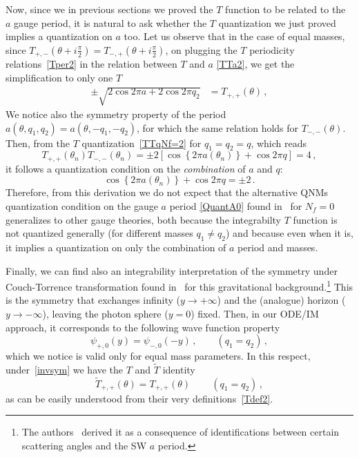 \documentclass[11pt,a4paper]{elsarticle}
\def \th {\theta}
\def \ba {\begin{aligned}}
\def \ea {\end{aligned}}
\newcommand{\be}{\begin{equation}}
\newcommand{\ee}{\end{equation}}
\def\th{\theta}
\numberwithin{figure}{section}
\numberwithin{table}{section}
\begin{document}
Now, since we in previous sections we proved the $T$ function to be related to the $a$ gauge period, it is natural to ask whether the $T$ quantization we just proved implies a quantization on $a$ too. Let us observe that in the case of equal masses, since $T_{+,-}(\th+i \frac{\pi}{2})= T_{-,+}(\th+i \frac{\pi}{2})$, on plugging the $T$ periodicity relations~\eqref{Tper2} in the relation between $T$ and $a$ 
 \eqref{TTa2}, we get the simplification to only one $T$
\be \label{TnuNf=2simp}
\ba
\pm \sqrt{2 \cos 2\pi a + 2 \cos 2 \pi q_2} &= T_{+,+}(\th)\,,%
\ea
\ee 
We notice also the symmetry property of the period $a(\theta,q_1,q_2) = a(\theta,-q_1,-q_2)$, %
for which the same relation holds for $T_{-,-}(\th)$. %
Then, from the $T$ quantization~\eqref{TTqNf=2} for $q_1=q_2=q$, which reads
\be 
T_{+,+}(\th_n) T_{-,-}(\th_n) =\pm2 \left[ \cos \left\{2\pi a (\th_n)\right\}+  \cos 2 \pi q \right] = 4\,,
\ee 
it follows a quantization condition on the \textit{combination} of $a$ and $q$:
\be  \label{nuqQuant}
 \cos \left\{2\pi a (\th_n)\right\}+ \cos  2 \pi q   =\pm  2 \, .
\ee
Therefore, from this derivation we do not expect that the alternative QNMs quantization condition on the gauge $a$ period \eqref{QuantA0} found in~\cite{BianchiConsoliGrilloMorales:2021} for $N_f=0$ generalizes to other gauge theories, both because the integrabilty $T$ function is not quantized generally (for different masses $q_1\neq q_2$) and because even when it is, it implies a quantization on only the combination of $a $ period and masses.

Finally, we can find also an integrability interpretation of the symmetry under Couch-Torrence transformation found in~\cite{BianchiDiRusso:2021} for this gravitational background.\footnote{The authors~\cite{BianchiDiRusso:2021} derived it as a consequence of identifications between certain scattering angles and the SW $a$ period.} This is the symmetry that exchanges infinity ($y \to + \infty$) and the (analogue) horizon ($y \to - \infty$), leaving the photon sphere ($y=0$) fixed. Then, in our ODE/IM approach, it corresponds to the following wave function property
\be  \label{invsym}
\psi_{+,0}(y) = \psi_{-,0}(-y)\,, \qquad (q_1=q_2)\,,
\ee 
which we notice is valid only for equal mass parameters. In this respect, under~\eqref{invsym} we have the $T$ and $\tilde{T}$ identity
\be 
\tilde{T}_{+,+}(\th) = T_{+,+}(\th)\, \qquad (q_1=q_2) \,,
\ee
as can be easily understood from their very definitions~\eqref{Tdef2}.
\end{document}
